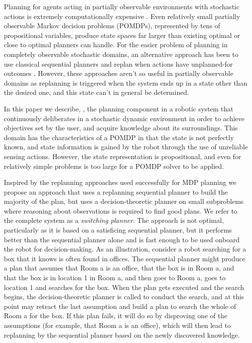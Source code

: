 Planning for agents acting in partially observable environments with
stochastic actions is extremely computationally
expensive \cite{mdp-complexity}. Even relatively small partially
observable Markov decision problems (POMDPs), represented by tens of
propositional variables, produce state spaces far larger than existing
optimal or close to optimal planners can handle. For the easier
problem of planning in completely observable stochastic domains, an
alternative approach has been to use classical sequential planners and
replan when actions have unplanned-for
outcomes \cite{yoon:etal:2007}. However, these approaches aren't so
useful in partially observable domains as replanning is triggered when
the system ends up in a state other than the desired one, and this
state can't in general be determined.

In this paper we describe, \pcogx, the planning component in a robotic
system that continuously deliberates in a stochastic dynamic
environment in order to achieve objectives set by the user, and
acquire knowledge about its surroundings. This domain has the
characteristics of a POMDP in that the state is not perfectly known,
and state information is gained by the robot through the use of
unreliable sensing actions. However, the state representation is
propositional, and even for relatively simple problems is too large
for a POMDP solver to be applied.

Inspired by the replanning approaches used successfully for MDP
planning \cite{yoon:etal:2007,yoon:etal:2008} we propose an approach
that uses a replanning sequential planner to build the majority of the
plan, but uses a decision-theoretic planner on small subproblems where
reasoning about observations is required to find good plans. We refer
to the complete system as a {\em switching planner}. The approach is
not optimal, particularly as it is based on a satisficing sequential
planner, but it performs better than the sequential planner alone and
is fast enough to be used onboard the robot for decision-making. As an
illustration, consider a robot searching for a box that it knows is
often found in offices. The sequential planner might produce a plan
that assumes that {\sc Room a} is an office, that the box is in {\sc
Room a}, and that the box is in location 1 in {\sc Room a}, and then
goes to {\sc Room a}, goes to location 1 and searches for the
box. When the plan gets executed and the search begins, the
decision-theoretic planner is called to conduct the search, and at
this point may retract the last assumption and build a plan to search
the whole of {\sc Room a} for the box. If this plan fails, it will do
so by disproving one of the assumptions (for example, that {\sc Room
a} is an office), which will then lead to replanning by the sequential
planner based on the newly discovered knowledge.

